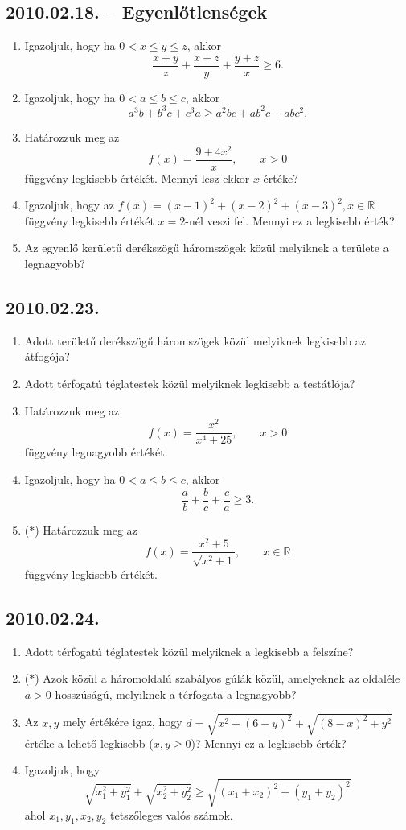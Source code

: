 \documentclass{article}
\begin{document}
\subsection*{2010.02.18. -- Egyenlőtlenségek}
\begin{enumerate}
\item Igazoljuk, hogy ha $0<x\le y\le z$, akkor
$$\dfrac{x+y}{z}+\dfrac{x+z}{y}+\dfrac{y+z}{x}\ge 6.$$
\item Igazoljuk, hogy ha $0<a\le b\le c$, akkor
$$a^3b+b^3c+c^3a\ge a^2bc+ab^2c+abc^2.$$
\item Határozzuk meg az
$$f(x)=\dfrac{9+4x^2}{x},\qquad x>0$$
függvény legkisebb értékét. Mennyi lesz ekkor $x$ értéke?
\item Igazoljuk, hogy az $f(x)=(x-1)^2+(x-2)^2+(x-3)^2, x\in\mathbb{R}$
függvény legkisebb értékét $x=2$-nél veszi fel. Mennyi ez a legkisebb érték?
\item Az egyenlő kerületű derékszögű háromszögek közül melyiknek a területe a 
legnagyobb?
\end{enumerate}

\subsection*{2010.02.23.}
\begin{enumerate}
\item Adott területű derékszögű háromszögek közül melyiknek legkisebb az átfogója?
\item Adott térfogatú téglatestek közül melyiknek legkisebb a testátlója?
\item Határozzuk meg az
$$f(x)=\dfrac{x^2}{x^4+25},\qquad x>0$$
függvény legnagyobb értékét.
\item Igazoljuk, hogy ha $0<a\le b\le c$, akkor
$$\dfrac{a}{b}+\dfrac{b}{c}+\dfrac{c}{a}\ge 3.$$
\item ($*$) Határozzuk meg az
$$f(x)=\dfrac{x^2+5}{\sqrt{x^2+1}},\qquad x\in\mathbb{R}$$
függvény legkisebb értékét.
\end{enumerate}

\subsection*{2010.02.24.}
\begin{enumerate}
\item Adott térfogatú téglatestek közül melyiknek a legkisebb a felszíne?
\item ($*$) Azok közül a háromoldalú szabályos gúlák közül, amelyeknek az oldaléle $a>0$ hosszúságú, melyiknek a térfogata a legnagyobb?
\item Az $x,y$ mely értékére igaz, hogy $d=\sqrt{x^2+(6-y)^2}+\sqrt{(8-x)^2+y^2}$
értéke a lehető legkisebb ($x,y\ge 0$)? Mennyi ez a legkisebb érték?
\item Igazoljuk, hogy
$$\sqrt{x_1^2+y_1^2}+\sqrt{x_2^2+y_2^2}\ge \sqrt{(x_1+x_2)^2+(y_1+y_2)^2}$$
ahol $x_1,y_1,x_2,y_2$ tetszőleges valós számok.
\end{enumerate}
\end{document}
